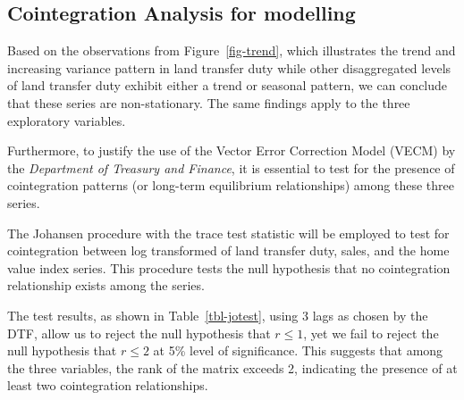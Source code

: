 \documentclass[
  11pt,
  a4paper,
]{article}
\begin{document}
\subsection{Cointegration Analysis for modelling}\label{sec-coint}

Based on the observations from Figure~\ref{fig-trend}, which illustrates
the trend and increasing variance pattern in land transfer duty while
other disaggregated levels of land transfer duty exhibit either a trend
or seasonal pattern, we can conclude that these series are
non-stationary. The same findings apply to the three exploratory
variables.

Furthermore, to justify the use of the Vector Error Correction Model
(VECM) by the \emph{Department of Treasury and Finance}, it is essential
to test for the presence of cointegration patterns (or long-term
equilibrium relationships) among these three series.

The Johansen procedure with the trace test statistic will be employed to
test for cointegration between log transformed of land transfer duty,
sales, and the home value index series. This procedure tests the null
hypothesis that no cointegration relationship exists among the series.

\begin{table}

\caption{\label{tbl-jotest}Johansen test result}


\end{table}%

The test results, as shown in Table~\ref{tbl-jotest}, using 3 lags as
chosen by the DTF, allow us to reject the null hypothesis that
\(r \leq 1\), yet we fail to reject the null hypothesis that
\(r \leq 2\) at 5\% level of significance. This suggests that among the
three variables, the rank of the matrix exceeds 2, indicating the
presence of at least two cointegration relationships.
\end{document}
